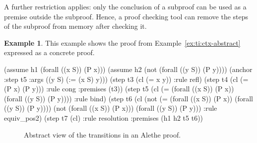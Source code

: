 \documentclass{scrartcl}
\theoremstyle{definition}
\newtheorem{example}{Example}
\begin{document}
A further restriction applies: only the conclusion of a subproof can be used
as a premise outside the subproof. Hence, a proof checking tool can
remove the steps of the subproof from memory after checking it.

\begin{example}
\label{ex:ti:ctx-concrete}
This example shows the proof from Example~\ref{ex:ti:ctx-abstract}
expressed as a concrete proof.

\begin{AletheVerb}
(assume h1 (forall ((x S)) (P x)))
(assume h2 (not (forall ((y S)) (P y))))
(anchor :step t5 :args ((y S) (:= (x S) y)))
(step t3 (cl (= x y)) :rule refl)
(step t4 (cl (= (P x) (P y))) :rule cong :premises (t3))
(step t5 (cl (= (forall ((x S)) (P x)) (forall ((y S)) (P y))))
                              :rule bind)
(step t6 (cl (not (= (forall ((x S)) (P x)) (forall ((y S)) (P y))))
             (not (forall ((x S)) (P x)))
             (forall ((y S)) (P y))) :rule equiv_pos2)
(step t7 (cl) :rule resolution :premises (h1 h2 t5 t6))
\end{AletheVerb}
\end{example}


\begin{figure}[h]
\center
{}
\label{fig:proof-states}\caption{Abstract view of the transitions in an Alethe proof.}
\end{figure}
\end{document}
